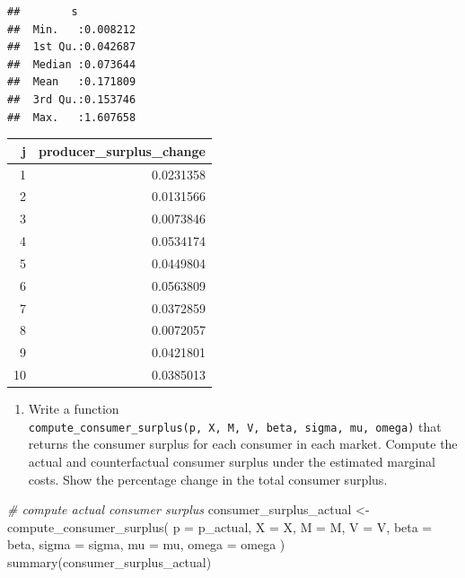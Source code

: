 \documentclass[
]{book}
\newenvironment{Shaded}{\begin{snugshade}}{\end{snugshade}}
\newcommand{\AttributeTok}[1]{\textcolor[rgb]{0.77,0.63,0.00}{#1}}
\newcommand{\CommentTok}[1]{\textcolor[rgb]{0.56,0.35,0.01}{\textit{#1}}}
\newcommand{\FunctionTok}[1]{\textcolor[rgb]{0.00,0.00,0.00}{#1}}
\newcommand{\NormalTok}[1]{#1}
\newcommand{\OtherTok}[1]{\textcolor[rgb]{0.56,0.35,0.01}{#1}}
\providecommand{\tightlist}{%
  \setlength{\itemsep}{0pt}\setlength{\parskip}{0pt}}
\begin{document}
\begin{verbatim}
##        s           
##  Min.   :0.008212  
##  1st Qu.:0.042687  
##  Median :0.073644  
##  Mean   :0.171809  
##  3rd Qu.:0.153746  
##  Max.   :1.607658
\end{verbatim}

\begin{tabular}{r|r}
\hline
j & producer\_surplus\_change\\
\hline
1 & 0.0231358\\
\hline
2 & 0.0131566\\
\hline
3 & 0.0073846\\
\hline
4 & 0.0534174\\
\hline
5 & 0.0449804\\
\hline
6 & 0.0563809\\
\hline
7 & 0.0372859\\
\hline
8 & 0.0072057\\
\hline
9 & 0.0421801\\
\hline
10 & 0.0385013\\
\hline
\end{tabular}

\begin{enumerate}
\def\labelenumi{\arabic{enumi}.}
\setcounter{enumi}{3}
\tightlist
\item
  Write a function \texttt{compute\_consumer\_surplus(p,\ X,\ M,\ V,\ beta,\ sigma,\ mu,\ omega)} that returns the consumer surplus for each consumer in each market. Compute the actual and counterfactual consumer surplus under the estimated marginal costs. Show the percentage change in the total consumer surplus.
\end{enumerate}

\begin{Shaded}
\begin{Highlighting}[]
\CommentTok{\# compute actual consumer surplus}
\NormalTok{consumer\_surplus\_actual }\OtherTok{\textless{}{-}} 
  \FunctionTok{compute\_consumer\_surplus}\NormalTok{(}
    \AttributeTok{p =}\NormalTok{ p\_actual, }
    \AttributeTok{X =}\NormalTok{ X, }
    \AttributeTok{M =}\NormalTok{ M, }
    \AttributeTok{V =}\NormalTok{ V, }
    \AttributeTok{beta =}\NormalTok{ beta, }
    \AttributeTok{sigma =}\NormalTok{ sigma, }
    \AttributeTok{mu =}\NormalTok{ mu, }
    \AttributeTok{omega =}\NormalTok{ omega}
\NormalTok{    )}
\FunctionTok{summary}\NormalTok{(consumer\_surplus\_actual)}
\end{Highlighting}
\end{Shaded}
\end{document}
